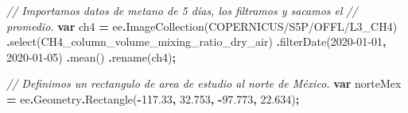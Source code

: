 \documentclass[
  12pt,
  letterpaper,
  twoside]{book}
\newenvironment{Shaded}{\begin{snugshade}}{\end{snugshade}}
\newcommand{\AttributeTok}[1]{\textcolor[rgb]{0.77,0.63,0.00}{#1}}
\newcommand{\CommentTok}[1]{\textcolor[rgb]{0.56,0.35,0.01}{\textit{#1}}}
\newcommand{\FloatTok}[1]{\textcolor[rgb]{0.00,0.00,0.81}{#1}}
\newcommand{\FunctionTok}[1]{\textcolor[rgb]{0.00,0.00,0.00}{#1}}
\newcommand{\KeywordTok}[1]{\textcolor[rgb]{0.13,0.29,0.53}{\textbf{#1}}}
\newcommand{\NormalTok}[1]{#1}
\newcommand{\OperatorTok}[1]{\textcolor[rgb]{0.81,0.36,0.00}{\textbf{#1}}}
\newcommand{\StringTok}[1]{\textcolor[rgb]{0.31,0.60,0.02}{#1}}
\begin{document}
\begin{Shaded}
\begin{Highlighting}[]
\CommentTok{// Importamos datos de metano de 5 días, los filtramos y sacamos el }
\CommentTok{// promedio.}
\KeywordTok{var}\NormalTok{ ch4 }\OperatorTok{=}\NormalTok{ ee}\OperatorTok{.}\FunctionTok{ImageCollection}\NormalTok{(}\StringTok{\textquotesingle{}COPERNICUS/S5P/OFFL/L3\_CH4\textquotesingle{}}\NormalTok{)}
  \OperatorTok{.}\FunctionTok{select}\NormalTok{(}\StringTok{\textquotesingle{}CH4\_column\_volume\_mixing\_ratio\_dry\_air\textquotesingle{}}\NormalTok{)}
  \OperatorTok{.}\FunctionTok{filterDate}\NormalTok{(}\StringTok{\textquotesingle{}2020{-}01{-}01\textquotesingle{}}\OperatorTok{,} \StringTok{\textquotesingle{}2020{-}01{-}05\textquotesingle{}}\NormalTok{)}
  \OperatorTok{.}\FunctionTok{mean}\NormalTok{()}
  \OperatorTok{.}\FunctionTok{rename}\NormalTok{(}\StringTok{\textquotesingle{}ch4\textquotesingle{}}\NormalTok{)}\OperatorTok{;}

\CommentTok{// Definimos un rectangulo de area de estudio al norte de México.}
\KeywordTok{var}\NormalTok{ norteMex }\OperatorTok{=}
\NormalTok{  ee}\OperatorTok{.}\AttributeTok{Geometry}\OperatorTok{.}\FunctionTok{Rectangle}\NormalTok{(}\OperatorTok{{-}}\FloatTok{117.33}\OperatorTok{,} \FloatTok{32.753}\OperatorTok{,} \OperatorTok{{-}}\FloatTok{97.773}\OperatorTok{,} \FloatTok{22.634}\NormalTok{)}\OperatorTok{;}


\end{Highlighting}
\end{Shaded}
\end{document}
